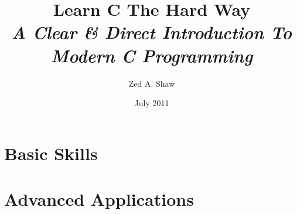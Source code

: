


\title{
    Learn C The Hard Way\\
    \textit{A Clear \& Direct Introduction To Modern C Programming}
}
\author{Zed A. Shaw}
\date{July 2011}



\frontmatter

\maketitle

\tableofcontents


\mainmatter



\part{Basic Skills}




























\part{Advanced Applications}





























\appendix



